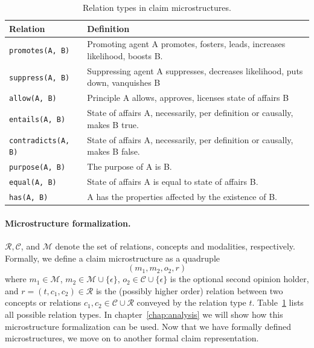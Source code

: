 \begin{table}
{\footnotesize
\begin{tabular}{lp{}}
\toprule
\textbf{Relation} & \textbf{Definition} \\
\midrule
\texttt{promotes(A, B)} & Promoting agent A promotes, fosters, leads, increases likelihood, boosts B.  \\
\texttt{suppress(A, B)} & Suppressing agent A suppresses, decreases likelihood, puts down, vanquishes B \\
\midrule
\texttt{allow(A, B)} & Principle A allows, approves, licenses state of affairs B \\
\midrule
\texttt{entails(A, B)} & State of affairs A, necessarily, per definition or causally, makes B true. \\
\texttt{contradicts(A, B)} & State of affairs A, necessarily, per definition or causally, makes B false. \\
\midrule
\texttt{purpose(A, B)} & The purpose of A is B. \\
\midrule
\texttt{equal(A, B)} & State of affairs A is equal to state of affairs B. \\
\midrule
\texttt{has(A, B)} & A has the properties affected by the existence of B.  \\
\bottomrule
\end{tabular}}
\caption{Relation types in claim microstructures.}
\label{tab:microstructures_relations}
\end{table}

\paragraph{Microstructure formalization. }$\mathcal{R}, \mathcal{C}$, and
$\mathcal{M}$ denote the set of relations, concepts and
modalities, respectively. 
Formally, we define a claim microstructure as a quadruple 
$$
(m_1, m_2, o_2, r)
$$ 
where $m_1 \in \mathcal{M}$, $m_2 \in \mathcal{M} \cup \{\epsilon\}$,
$o_2 \in \mathcal{C} \cup \{\epsilon\}$ is the optional second opinion holder, and 
$r = (t, c_1, c_2) \in \mathcal{R}$ is the (possibly higher order) relation 
between two concepts or relations $c_1, c_2 \in \mathcal{C} \cup \mathcal{R}$
conveyed by the relation type $t$.
Table~\ref{tab:microstructures_relations} lists all possible relation types. 
In chapter~\ref{chap:analysis} we will show
how this microstructure formalization can be used. 
Now that we have formally defined microstructures, we move on to another
formal claim representation. 

